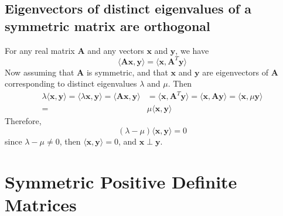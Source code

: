 \documentclass{report}
\begin{document}
\subsection{Eigenvectors of distinct eigenvalues of a symmetric matrix are orthogonal}
For any real matrix $\bm A$ and any vectors $\bm x$ and $\bm y$, we have
\begin{equation*}
\langle\bm{Ax},\bm y\rangle=\langle\bm x,\bm A^T\bm y\rangle
\end{equation*}
Now assuming that $\bm A$ is symmetric, and that $\bm x$ and $\bm y$ are eigenvectors of $\bm A$ corresponding to distinct eigenvalues $\lambda$
and $\mu$. Then 
\begin{align*}
\lambda\langle\bm x,\bm y\rangle=\langle\lambda\bm x,\bm y\rangle
=\langle\bm A\bm x,\bm y\rangle&=\langle\bm x,\bm A^T\bm y\rangle
=\langle\bm x,\bm A\bm y\rangle=\langle\bm x,\mu\bm y\rangle\\
=&\mu\langle\bm x,\bm y\rangle
\end{align*}
Therefore,
\begin{equation*}
(\lambda-\mu)\langle\bm x,\bm y\rangle=0
\end{equation*}
since $\lambda-\mu\neq0$, then $\langle\bm x,\bm y\rangle=0$, and $\bm x\perp\bm y$.
\newpage

\section{Symmetric Positive Definite Matrices}
\end{document}
